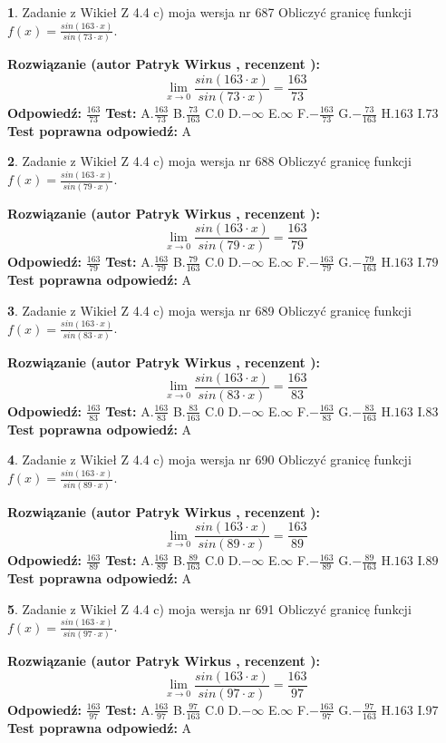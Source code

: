 \documentclass[12pt, a4paper]{article}
\theoremstyle{definition} %
\newtheorem{zad}{}
\newcommand{\zadStart}[1]{\begin{zad}#1\newline}
\newcommand{\zadStop}{\end{zad}}
\newcommand{\rozwStart}[2]{\noindent \textbf{Rozwiązanie (autor #1 , recenzent #2): }\newline}
\newcommand{\rozwStop}{\newline}
\newcommand{\odpStart}{\noindent \textbf{Odpowiedź:}\newline}
\newcommand{\odpStop}{\newline}
\newcommand{\testStart}{\noindent \textbf{Test:}\newline}
\newcommand{\testStop}{\newline}
\newcommand{\kluczStart}{\noindent \textbf{Test poprawna odpowiedź:}\newline}
\newcommand{\kluczStop}{\newline}
\begin{document}
\zadStart{Zadanie z Wikieł Z 4.4 c) moja wersja nr 687}
Obliczyć granicę funkcji $f(x)=\frac{sin(163\cdot x)}{sin(73\cdot x)}$.
\zadStop
\rozwStart{Patryk Wirkus}{}
$$\lim\limits_{x\to 0}\frac{sin(163\cdot x)}{sin(73\cdot x)}=
\frac{163}{73}$$
\rozwStop
\odpStart
$\frac{163}{73}$
\odpStop
\testStart
A.$\frac{163}{73}$
B.$\frac{73}{163}$
C.$0$
D.$-\infty$
E.$\infty$
F.$-\frac{163}{73}$
G.$-\frac{73}{163}$
H.$163$
I.$73$
\testStop
\kluczStart
A
\kluczStop



\zadStart{Zadanie z Wikieł Z 4.4 c) moja wersja nr 688}
Obliczyć granicę funkcji $f(x)=\frac{sin(163\cdot x)}{sin(79\cdot x)}$.
\zadStop
\rozwStart{Patryk Wirkus}{}
$$\lim\limits_{x\to 0}\frac{sin(163\cdot x)}{sin(79\cdot x)}=
\frac{163}{79}$$
\rozwStop
\odpStart
$\frac{163}{79}$
\odpStop
\testStart
A.$\frac{163}{79}$
B.$\frac{79}{163}$
C.$0$
D.$-\infty$
E.$\infty$
F.$-\frac{163}{79}$
G.$-\frac{79}{163}$
H.$163$
I.$79$
\testStop
\kluczStart
A
\kluczStop



\zadStart{Zadanie z Wikieł Z 4.4 c) moja wersja nr 689}
Obliczyć granicę funkcji $f(x)=\frac{sin(163\cdot x)}{sin(83\cdot x)}$.
\zadStop
\rozwStart{Patryk Wirkus}{}
$$\lim\limits_{x\to 0}\frac{sin(163\cdot x)}{sin(83\cdot x)}=
\frac{163}{83}$$
\rozwStop
\odpStart
$\frac{163}{83}$
\odpStop
\testStart
A.$\frac{163}{83}$
B.$\frac{83}{163}$
C.$0$
D.$-\infty$
E.$\infty$
F.$-\frac{163}{83}$
G.$-\frac{83}{163}$
H.$163$
I.$83$
\testStop
\kluczStart
A
\kluczStop



\zadStart{Zadanie z Wikieł Z 4.4 c) moja wersja nr 690}
Obliczyć granicę funkcji $f(x)=\frac{sin(163\cdot x)}{sin(89\cdot x)}$.
\zadStop
\rozwStart{Patryk Wirkus}{}
$$\lim\limits_{x\to 0}\frac{sin(163\cdot x)}{sin(89\cdot x)}=
\frac{163}{89}$$
\rozwStop
\odpStart
$\frac{163}{89}$
\odpStop
\testStart
A.$\frac{163}{89}$
B.$\frac{89}{163}$
C.$0$
D.$-\infty$
E.$\infty$
F.$-\frac{163}{89}$
G.$-\frac{89}{163}$
H.$163$
I.$89$
\testStop
\kluczStart
A
\kluczStop



\zadStart{Zadanie z Wikieł Z 4.4 c) moja wersja nr 691}
Obliczyć granicę funkcji $f(x)=\frac{sin(163\cdot x)}{sin(97\cdot x)}$.
\zadStop
\rozwStart{Patryk Wirkus}{}
$$\lim\limits_{x\to 0}\frac{sin(163\cdot x)}{sin(97\cdot x)}=
\frac{163}{97}$$
\rozwStop
\odpStart
$\frac{163}{97}$
\odpStop
\testStart
A.$\frac{163}{97}$
B.$\frac{97}{163}$
C.$0$
D.$-\infty$
E.$\infty$
F.$-\frac{163}{97}$
G.$-\frac{97}{163}$
H.$163$
I.$97$
\testStop
\kluczStart
A
\kluczStop
\end{document}
